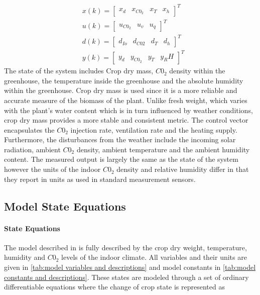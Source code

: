 \begin{equation}
	\begin{aligned}
		& x(k) = \begin{bmatrix}
			x_d & x_{C0_2} & x_T & x_h
		\end{bmatrix}^T
		\\
		& u(k) = \begin{bmatrix}
			u_{C0_2} & u_{v} & u_q
		\end{bmatrix}^T
		\\
		& d(k) = \begin{bmatrix}
			d_{Io} & d_{C02} & d_T& d_h
		\end{bmatrix}^T
		\\
		& y(k) = \begin{bmatrix}
			y_d & y_{C0_2} & y_T & y_RH
		\end{bmatrix}^T
	\end{aligned}
	\label{eq: model vectors}
\end{equation}
The state of the system includes Crop dry mass, $C0_2$ density within the greenhouse, the temperature inside the greenhouse and the absolute humidity within the greenhouse. Crop dry mass is used since it is a more reliable and accurate measure of the biomass of the plant. Unlike fresh weight, which varies with the plant's water content which is in turn influenced by weather conditions, crop dry mass provides a more stable and consistent metric. The control vector encapsulates the $C0_2$ injection rate, ventilation rate and the heating supply. Furthermore, the disturbances from the weather include the incoming solar radiation, ambient $C0_2$ density, ambient temperature and the ambient humidity content. The measured output is largely the same as the state of the system however the units of the indoor $C0_2$ density and relative humidity differ in that they report in units as used in standard measurement sensors.



\subsection {Model State Equations}

\paragraph{State Equations}
The model described in \cite{hentenGreenhouseClimateManagement1994} is fully described by the crop dry weight, temperature, humidity and $C0_2$ levels of the indoor climate. All variables and their units are given in \autoref{tab:model variables and descriptions} and model constants in \autoref{tab:model constants and descriptions}. These states are modeled through a set of ordinary differentiable equations where the change of crop state is represented as

